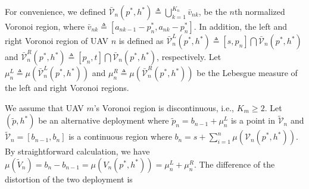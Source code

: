 \documentclass[smallabstract,smallcaptions]{dccpaper}
\newcommand{\Vor}{\ensuremath{\mathcal{V}}}         %
\begin{document}
For convenience, we defined $\bar{\Vor}_n(p^*,
h^*)\triangleq\bigcup_{k=1}^{K_n}\bar{v}_{nk}$, be the $n$th normalized Voronoi region, where
$\bar{v}_{nk}\triangleq[a_{nk-1}-p^*_n,a_{nk}-p^*_n]$.
In addition, the left and right Voronoi region of UAV $n$ is defined as $\bar{\Vor}^{L}_{n}(p^*, h^*) \triangleq
[s,p_n]\bigcap\bar{\Vor}_{n}(p^*, h^*)$ and $\bar{\Vor}^{R}_{n}(p^*, h^*) \triangleq [p_n, t]\bigcap\bar{\Vor}_{n}(p^*,
h^*)$, respectively.  Let $\mu^L_n\triangleq\mu\left(\bar{\Vor}^{L}_{n}(p^*, h^*)\right)$ and
$\mu^R_n\triangleq\mu\left(\bar{\Vor}^{R}_{n}(p^*, h^*)\right)$ be the Lebesgue measure of the left and right Voronoi
regions.

We assume that UAV $m$'s Voronoi region is discontinuous, i.e., $K_m\ge2$.  Let $(\widetilde{p},h^*)$ be an alternative
deployment where $\widetilde{p}_n=b_{n-1}+\mu^L_{n}$ is a point in $\widetilde{\Vor}_n$ and
$\widetilde{\Vor}_{n}=[b_{n-1}, b_n]$ is a continuous region where
$b_n=s+\sum_{i=1}^{n}\mu\left({\Vor}_{n}(p^*,h^*)\right)$.  By straightforward calculation, we have
$\mu(\widetilde{V}_{n})=b_n-b_{n-1}=\mu({V}_{n}(p^*,h^*))=\mu^L_n+\mu^R_n$.  The difference of the distortion of the two
deployment is
%
\end{document}
